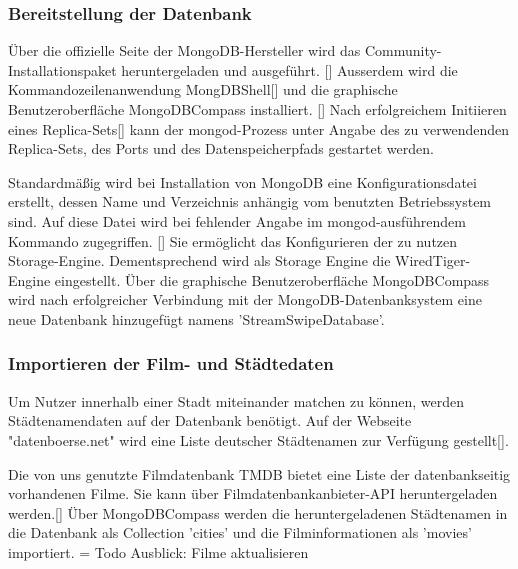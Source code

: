 \subsubsection{Bereitstellung der Datenbank}
Über die offizielle Seite der MongoDB-Hersteller wird das Community-Installationspaket heruntergeladen und ausgeführt. []
Ausserdem wird die Kommandozeilenanwendung MongDBShell[] und die
graphische Benutzeroberfläche MongoDBCompass installiert. []
Nach erfolgreichem Initiieren eines Replica-Sets[]
kann der mongod-Prozess unter Angabe des zu verwendenden Replica-Sets, des Ports und des Datenspeicherpfads gestartet werden. \newline



Standardmäßig wird bei Installation von MongoDB eine Konfigurationsdatei erstellt, dessen Name und Verzeichnis anhängig vom benutzten Betriebssystem sind. Auf diese Datei wird bei fehlender Angabe im mongod-ausführendem Kommando zugegriffen. [] 
Sie ermöglicht das Konfigurieren der zu nutzen Storage-Engine. Dementsprechend wird als Storage Engine die WiredTiger-Engine eingestellt. 
Über die graphische Benutzeroberfläche MongoDBCompass wird nach erfolgreicher Verbindung mit der MongoDB-Datenbanksystem eine neue Datenbank hinzugefügt namens 'StreamSwipeDatabase'.

\subsubsection{Importieren der Film- und Städtedaten}
Um Nutzer innerhalb einer Stadt miteinander matchen zu können, werden Städtenamendaten auf der Datenbank benötigt. Auf der Webseite "datenboerse.net" wird eine Liste deutscher Städtenamen zur Verfügung gestellt[].\newline


Die von uns genutzte Filmdatenbank TMDB bietet eine Liste der datenbankseitig vorhandenen Filme. Sie kann über Filmdatenbankanbieter-API heruntergeladen werden.[]
\newline
Über MongoDBCompass werden die heruntergeladenen Städtenamen in die Datenbank als Collection 'cities' und die Filminformationen als 'movies' importiert.
\newline
=\> Todo Ausblick: Filme aktualisieren
